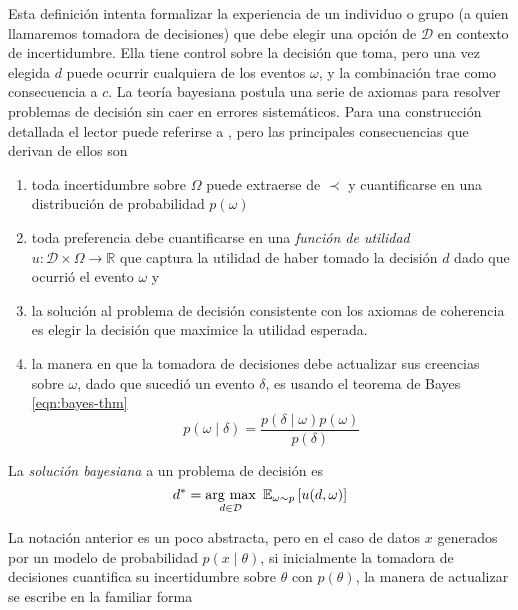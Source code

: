 \documentclass[main.tex]{subfiles}
\begin{document}
Esta definición intenta formalizar la experiencia de un individuo o grupo (a quien llamaremos tomadora de decisiones) que debe elegir una opción de $\mathcal{D}$ en contexto de incertidumbre. Ella tiene control sobre la decisión que toma, pero una vez elegida $d$ puede ocurrir cualquiera de los eventos $\omega$, y la combinación trae como consecuencia a $c$. La teoría bayesiana postula una serie de axiomas para resolver problemas de decisión sin caer en errores sistemáticos. Para una construcción detallada el lector puede referirse a \cite{bernardo}, pero las principales consecuencias que derivan de ellos son
\begin{enumerate}[label=\roman*]
	\item toda incertidumbre sobre $\Omega$ puede extraerse de $\prec$ y cuantificarse en una distribución de probabilidad $p(\omega)$
	\item toda preferencia debe cuantificarse en una \textit{función de utilidad} \\  $u: \mathcal{D}\times\Omega \to \mathbb{R}$  que captura la utilidad de haber tomado la decisión $d$ dado que ocurrió el evento   $\omega$ y
	\item la solución al problema de decisión consistente con los axiomas de coherencia es elegir la decisión que maximice la utilidad esperada.
	\item la manera en que la tomadora de decisiones debe actualizar sus creencias sobre $\omega$, dado que sucedió un evento $\delta$, es usando el teorema de Bayes \eqref{eqn:bayes-thm}
		\begin{equation*}
		p(\omega\mid\delta) = \frac{p(\delta\mid\omega)p(\omega)}{p(\delta)}
		\end{equation*}

\end{enumerate}

\begin{definition}
	La \textit{solución bayesiana} a un problema de decisión es 
	\begin{equation}
	d^* = \argmax_{d \in\mathcal{D}} \ \mathbb{E}_{\omega\sim p}\left[u(d, \omega)\right]
	\end{equation}
\end{definition}

La notación anterior es un poco abstracta, pero en el caso de datos $x$ generados por un modelo de probabilidad $p(x\mid\theta)$, si inicialmente la tomadora de decisiones cuantifica su incertidumbre sobre $\theta$ con $p(\theta)$, la manera de actualizar se escribe en la familiar forma
\end{document}

